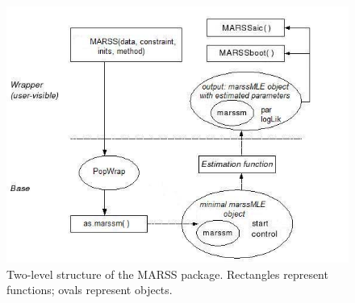 \begin{figure}[htp]
\begin{center}
\includegraphics{../figures/Fig1}
\end{center}
\caption{Two-level structure of the MARSS package.  Rectangles represent functions; ovals represent objects.}
\end{figure}

